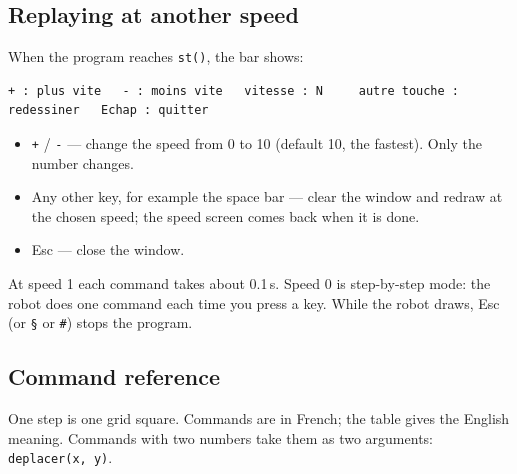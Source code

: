 \documentclass[11pt,a4paper]{article}
\newcommand{\kbd}[1]{\texttt{#1}}
\begin{document}
\subsection{Replaying at another speed}\label{sec:replay}
When the program reaches \kbd{st()}, the bar shows:
\begin{lstlisting}
+ : plus vite   - : moins vite   vitesse : N     autre touche : redessiner   Echap : quitter
\end{lstlisting}
\begin{itemize}
\item \kbd{+} / \kbd{-} --- change the speed from 0 to 10 (default 10, the
  fastest). Only the number changes.
\item Any other key, for example the space bar --- clear the window and
  redraw at the chosen speed; the speed screen comes back when it is done.
\item Esc --- close the window.
\end{itemize}
At speed 1 each command takes about 0.1\,s. Speed 0 is step-by-step mode:
the robot does one command each time you press a key. While the robot
draws, Esc (or \kbd{\S} or \kbd{\#}) stops the program.

\subsection{Command reference}
One step is one grid square. Commands are in French; the table gives the
English meaning. Commands with two numbers take them as two arguments:
\kbd{deplacer(x, y)}.
\end{document}
